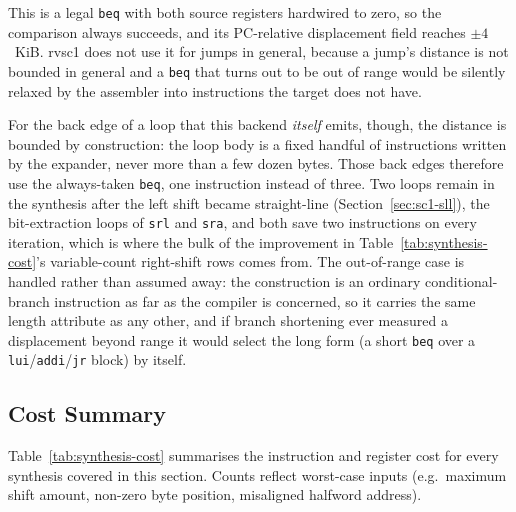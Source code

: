 This is a legal \texttt{beq} with both source registers hardwired to zero, so the comparison always
succeeds, and its PC-relative displacement field reaches $\pm 4$~KiB. rvsc1 does not use it for jumps
in general, because a jump's distance is not bounded in general and a \texttt{beq} that turns out to
be out of range would be silently relaxed by the assembler into instructions the target does not have.

For the back edge of a loop that this backend \textit{itself} emits, though, the distance is bounded
by construction: the loop body is a fixed handful of instructions written by the expander, never more
than a few dozen bytes. Those back edges therefore use the always-taken \texttt{beq}, one instruction
instead of three. Two loops remain in the synthesis after the left shift became straight-line
(Section~\ref{sec:sc1-sll}), the bit-extraction loops of \texttt{srl} and \texttt{sra}, and both
save two instructions on every iteration, which is where the bulk of the improvement in
Table~\ref{tab:synthesis-cost}'s variable-count right-shift rows comes from. The out-of-range case is
handled rather than assumed away: the construction is an ordinary conditional-branch instruction as
far as the compiler is concerned, so it carries the same length attribute as any other, and if branch
shortening ever measured a displacement beyond range it would select the long form (a short
\texttt{beq} over a \texttt{lui}/\texttt{addi}/\texttt{jr} block) by itself.

\subsection{Cost Summary} \label{sec:sc1-synthesis-cost}

Table~\ref{tab:synthesis-cost} summarises the instruction and register cost for every synthesis
covered in this section. Counts reflect worst-case inputs (e.g.\ maximum shift amount, non-zero byte
position, misaligned halfword address).


